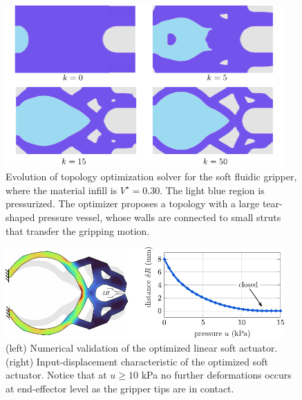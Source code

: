\begin{figure}[!t]
  \centering
  \includegraphics*[width=0.95\textwidth]{./pdf/thesis-figure-3-7.pdf}
  \caption{Evolution of topology optimization solver for the soft fluidic gripper, where the material infill is $V^\star = 0.30$. The light blue region is pressurized. The optimizer proposes a topology with a large tear-shaped pressure vessel, whose walls are connected to small struts that transfer the gripping motion.}
  \label{fig:C3:topo_result_gripper}
\end{figure}

\begin{figure}[!t]
  \centering
  \includegraphics*[width=0.95\textwidth]{./pdf/thesis-figure-3-6.pdf}
  \caption{(left) Numerical validation of the optimized linear soft actuator. (right) Input-displacement characteristic of the optimized soft actuator. Notice that at $u \ge 10$ \si{\kilo \pascal} no further deformations occurs at end-effector level as the gripper tips are in contact.}
  \label{fig:C3:topo_result_gripper_fem}
\end{figure}


